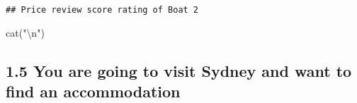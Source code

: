 \documentclass[
]{article}
\newenvironment{Shaded}{\begin{snugshade}}{\end{snugshade}}
\newcommand{\DecValTok}[1]{\textcolor[rgb]{0.00,0.00,0.81}{#1}}
\newcommand{\FunctionTok}[1]{\textcolor[rgb]{0.00,0.00,0.00}{#1}}
\newcommand{\NormalTok}[1]{#1}
\newcommand{\OtherTok}[1]{\textcolor[rgb]{0.56,0.35,0.01}{#1}}
\newcommand{\SpecialCharTok}[1]{\textcolor[rgb]{0.00,0.00,0.00}{#1}}
\newcommand{\StringTok}[1]{\textcolor[rgb]{0.31,0.60,0.02}{#1}}
\begin{document}
\begin{Shaded}
\end{Shaded}

\begin{verbatim}
## Price review score rating of Boat 2
\end{verbatim}

\begin{Shaded}
\begin{Highlighting}[]
\FunctionTok{cat}\NormalTok{(}\StringTok{"}\SpecialCharTok{\textbackslash{}n}\StringTok{"}\NormalTok{)}
\end{Highlighting}
\end{Shaded}

\hypertarget{you-are-going-to-visit-sydney-and-want-to-find-an-accommodation}{%
\subsection{1.5 You are going to visit Sydney and want to find an
accommodation}\label{you-are-going-to-visit-sydney-and-want-to-find-an-accommodation}}

\begin{Shaded}
\end{Shaded}
\end{document}
